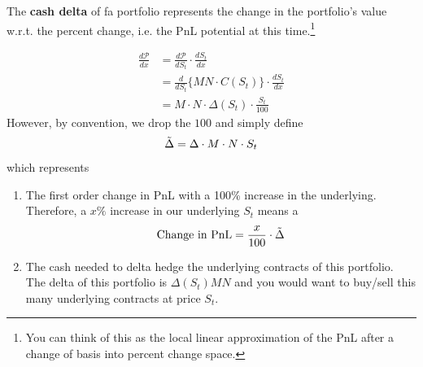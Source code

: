 \documentclass{article}
\begin{document}
    \begin{definition}
      The \textbf{cash delta} of  fa portfolio represents the change in the portfolio's value w.r.t. the percent change, i.e. the PnL potential at this time.\footnote{You can think of this as the local linear approximation of the PnL after a change of basis into percent change space. }

      \begin{align}
        \frac{d \mathcal{P}}{d x} & = \frac{d \mathcal{P}}{d S_t} \cdot \frac{d S_t}{d x} \\  
                                  & = \frac{d}{d S_t} \big\{ M N \cdot C(S_t) \big\} \cdot \frac{d S_t}{d x} \\
                                  & = M \cdot N \cdot \Delta (S_t) \cdot \frac{S_t}{100}
      \end{align}
      However, by convention, we drop the $100$ and simply define 
      \begin{equation}
        \Tilde{\Delta} = \Delta \cdot M \cdot N \cdot S_t
      \end{equation}
      which represents
      \begin{enumerate}
        \item The first order change in PnL with a 100\% increase in the underlying. Therefore, a $x\%$ increase in our underlying $S_t$ means a
          \begin{equation}
            \text{Change in PnL} = \frac{x}{100} \cdot \Tilde{\Delta}
          \end{equation}
        \item The cash needed to delta hedge the underlying contracts of this portfolio. The delta of this portfolio is $\Delta(S_t) M N$ and you would want to buy/sell this many underlying contracts at price $S_t$.
      \end{enumerate}
    \end{definition}
\end{document}
